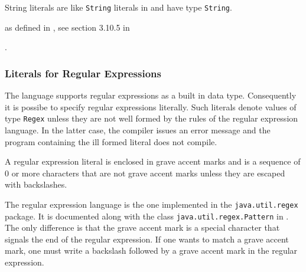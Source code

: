 String literals are like \texttt{String} literals in \java{} and have type \texttt{String}.

\begin{flushleft}
as defined in \java{}, see section 3.10.5 in \cite{langspec3}\\
\end{flushleft}

.

\subsubsection{Literals for Regular Expressions} \label{regexliteral}

The \frege{} language supports regular expressions as a built in data type. Consequently it is possibe to specify regular expressions literally. Such literals denote values of type \texttt{Regex} unless they are not well formed by the rules of the regular expression language. In the latter case, the compiler issues an error message and the program containing the ill formed literal does not compile.

\begin{flushleft}
  
\end{flushleft}

A regular expression literal is enclosed in grave accent marks and is a sequence of 0 or more characters that are not grave accent marks unless they are escaped with backslashes.

The regular expression language is the one implemented in the \texttt{java.util.regex} package. It is documented along with the class \texttt{java.util.regex.Pattern} in \cite{apidoc}.
The only difference is that the grave accent mark is a special character that signals the end of the regular expression.
If one wants to match a grave accent mark, one must write a backslash followed by a grave accent mark in the regular expression.



